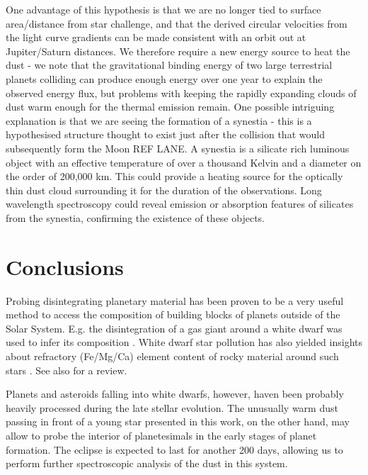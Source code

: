 \documentclass{aa}
\begin{document}

One advantage of this hypothesis is that we are no longer tied to surface area/distance from star challenge, and that the derived circular velocities from the light curve gradients can be made consistent with an orbit out at Jupiter/Saturn distances.
%
We therefore require a new energy source to heat the dust - we note that the gravitational binding energy of two large terrestrial planets colliding can produce enough energy over one year to explain the observed energy flux, but problems with keeping the rapidly expanding clouds of dust warm enough for the thermal emission remain.
%
One possible intriguing explanation is that we are seeing the formation of a synestia - this is a hypothesised structure thought to exist just after the collision that would subsequently form the Moon REF LANE.
%
A synestia is a silicate rich luminous object with an effective temperature of over a thousand Kelvin and a diameter on the order of 200,000 km.
%
This could provide a heating source for the optically thin dust cloud surrounding it for the duration of the observations.
%
Long wavelength spectroscopy could reveal emission or absorption features of silicates from the synestia, confirming the existence of these objects.



\section{Conclusions}\label{sec:conclusion}

Probing disintegrating planetary material has been proven to be a very useful method to access the composition of building blocks of planets outside of the Solar System.
%
E.g. the disintegration of a gas giant around a white dwarf was used to infer its composition \citep{Gaensike2019}.
%
White dwarf star pollution has also yielded insights about refractory (Fe/Mg/Ca) element content of rocky  material around such stars \citep{Turner2020,Putirka2021,Blouin2020}.
%
See also \cite{Veras2021} for a review.

Planets and asteroids falling into white dwarfs, however, haven been probably heavily processed during the late stellar evolution.
%
The unusually warm dust passing in front of a young star presented in this work, on the other hand, may allow to probe the interior of planetesimals in the early stages of planet formation.
%
The eclipse is expected to last for another 200 days, allowing us to perform further spectroscopic analysis of the dust in this system.
\end{document}
